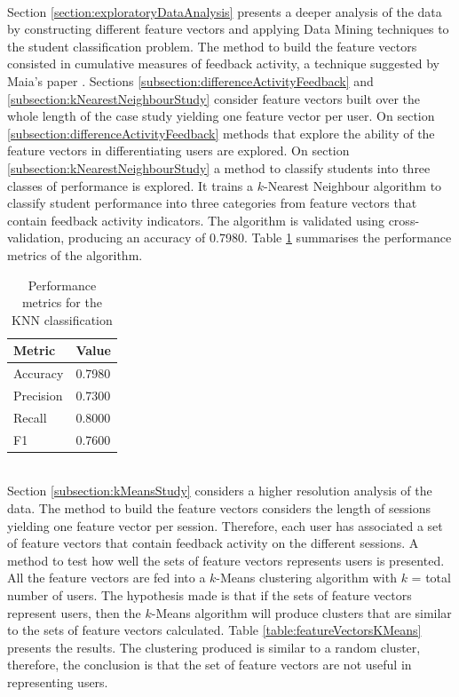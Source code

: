 \documentclass[11pt, oneside]{article}   	%
\begin{document}
\noindent \\Section \ref{section:exploratoryDataAnalysis} presents a deeper analysis of the data by constructing different feature vectors and applying Data Mining techniques to the student classification problem. The method to build the feature vectors consisted in cumulative measures of feedback activity, a technique suggested by Maia's paper \cite{Maia2008}. Sections \ref{subsection:differenceActivityFeedback} and \ref{subsection:kNearestNeighbourStudy} consider feature vectors built over the whole length of the case study yielding one feature vector per user. On section \ref{subsection:differenceActivityFeedback} methods that explore the ability of the feature vectors in differentiating users are explored. On section \ref{subsection:kNearestNeighbourStudy} a method to classify students into three classes of performance is explored. It trains a $k$-Nearest Neighbour algorithm to classify student performance into three categories from feature vectors that contain feedback activity indicators. The algorithm is validated using cross-validation, producing an accuracy of 0.7980. Table \ref{table:performanceMetrics} summarises the performance metrics of the algorithm.
\begin{table}[h]
	\centering
	\begin{tabular}{| l | l |}
		\hline
		 \textbf{Metric} & \textbf{Value} \\ \hline
		 Accuracy & 0.7980\\ \hline
		 Precision & 0.7300 \\ \hline
		 Recall & 0.8000 \\ \hline
		 F1 & 0.7600 \\ \hline
	\end{tabular}
	\caption{Performance metrics for the KNN classification}
	\label{table:performanceMetrics}
\end{table}
\noindent \\Section \ref{subsection:kMeansStudy} considers a higher resolution analysis of the data. The method to build the feature vectors considers the length of sessions yielding one feature vector per session. Therefore, each user has associated a set of feature vectors that contain feedback activity on the different sessions. A method to test how well the sets of feature vectors represents users is presented. All the feature vectors are fed into a $k$-Means clustering algorithm with $k$ = total number of users. The hypothesis made is that if the sets of feature vectors represent users, then the $k$-Means algorithm will produce clusters that are similar to the sets of feature vectors calculated. Table \ref{table:featureVectorsKMeans} presents the results. The clustering produced is similar to a random cluster, therefore, the conclusion is that the set of feature vectors are not useful in representing users.\\
\end{document}
